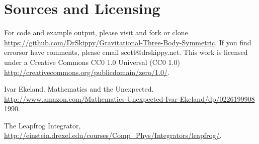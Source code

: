 \documentclass{article}
\begin{document}
%
%
%




\section{Sources and Licensing} 

For code and example output, please visit and fork or clone \url{https://github.com/DrSkippy/Gravitational-Three-Body-Symmetric}.
\noindent If you find errorsor have comments, please email scott@drskippy.net.
\noindent This work is licensed under a Creative Commons CC0 1.0 Universal (CC0 1.0) 
\noindent \url{http://creativecommons.org/publicdomain/zero/1.0/}.


\begin{thebibliography}{2013}

 Ivar Ekeland. Mathematics and the Unexpected.  \url{http://www.amazon.com/Mathematics-Unexpected-Ivar-Ekeland/dp/0226199908} 1990.

 The Leapfrog Integrator, \url{http://einstein.drexel.edu/courses/Comp_Phys/Integrators/leapfrog/}.

\end{thebibliography}
\end{document}
